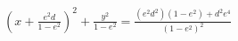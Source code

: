 \documentclass[preview]{standalone}
\begin{document}
\begin{align*}
(x+\frac{e^2d}{1-e^2})^2+\frac{y^2}{1-e^2}=\frac{(e^2d^2)(1-e^2)+d^2e^4}{(1-e^2)^2}
\end{align*}
\end{document}
